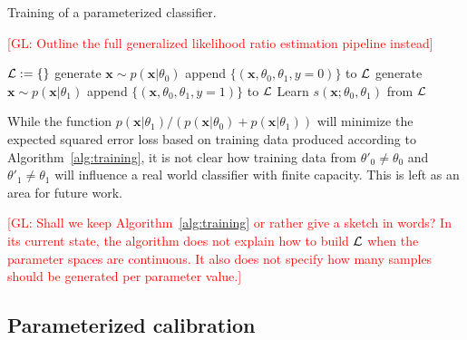 \documentclass[12pt]{article}
\numberwithin{equation}{section}
\theoremstyle{plain}
\newcommand{\glnote}[1]{\textcolor{red}{[GL: #1]}}
\begin{document}
\begin{algorithm}[t]
\caption{Training of a parameterized classifier.}\label{alg:training}
\glnote{Outline the full generalized likelihood ratio estimation pipeline instead}
    \begin{algorithmic}
        \State ${\cal L := \{ \}}$
        		\State generate $\mathbf{x} \sim p(\mathbf{x}|\theta_0)$
        		\State append $\{ (\mathbf{x}, \theta_0, \theta_1, y=0) \}$ to ${\cal L}$
        		\State generate $\mathbf{x} \sim p(\mathbf{x}|\theta_1)$
        		\State append $\{ (\mathbf{x}, \theta_0, \theta_1, y=1) \}$ to ${\cal L}$
        	\EndFor
        \EndFor
        \State Learn $s(\mathbf{x}; \theta_0, \theta_1)$ from ${\cal L}$
    \end{algorithmic}
\end{algorithm}

While the function
$p(\mathbf{x}|\theta_1)/(p(\mathbf{x}|\theta_0)+p(\mathbf{x}|\theta_1))$ will
minimize the expected squared error loss based on training data produced
according to Algorithm~\ref{alg:training}, it is not clear how training data
from $\theta'_0 \ne \theta_0$ and $\theta'_1 \ne \theta_1$ will influence a real
world classifier with finite capacity. This is left as an area for future work.

\glnote{Shall we keep Algorithm~\ref{alg:training} or rather give a sketch in
words? In its current state, the algorithm does not explain how to build ${\cal
L}$ when the parameter spaces are continuous. It also does not specify how many
samples should be generated per parameter value.}

\subsection{Parameterized calibration}
\end{document}
